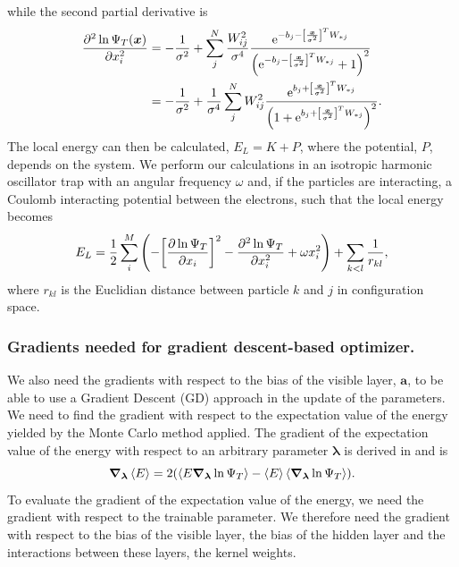 while the second partial derivative is
\begin{align*}
    \pdv[2]{\ln{\Psi_T\qty(\bm{x})}}{x_i} &= -\frac{1}{\sigma^2} + \sum_j^N \frac{W_{ij}^2}{\sigma^4} \frac{\mathrm{e}^{-b_j-\qty[\frac{\bm{x}}{\sigma^2}]^TW_{*j}}}{\qty(\mathrm{e}^{-b_j-\qty[\frac{\bm{x}}{\sigma^2}]^TW_{*j}} + 1)^2} \\
   &= -\frac{1}{\sigma^2} + \frac{1}{\sigma^4}\sum_j^N W_{ij}^2 \frac{\mathrm{e}^{b_j+\qty[\frac{\bm{x}}{\sigma^2}]^TW_{*j}}}{\qty(1 + \mathrm{e}^{b_j+\qty[\frac{\bm{x}}{\sigma^2}]^TW_{*j}})^2}. 
\end{align*}
The local energy can then be calculated, $E_L = K + P$, where the potential, $P$, depends on the system. We perform our calculations in an isotropic harmonic oscillator trap with an angular frequency $\omega$ and, if the particles are interacting, a Coulomb interacting potential between the electrons, such that the local energy becomes 
\begin{equation}
    E_L = \frac{1}{2}\sum_i^M\qty(-\qty[\pdv{\ln{\Psi_T}}{x_i}]^2-\pdv[2]{\ln{\Psi_T}}{x_i} + \omega x_i^2) + \sum_{k<l}\frac{1}{r_{kl}},  
\end{equation}
where $r_{kl}$ is the Euclidian distance between particle $k$ and $j$ in configuration space. 
\subsubsection{Gradients needed for gradient descent-based optimizer.}
We also need the gradients with respect to the bias of the visible layer, $\bm{a}$, to be able to use a Gradient Descent (GD) approach in the update of the parameters. We need to find the gradient with respect to the expectation value of the energy yielded by the Monte Carlo method applied. The gradient of the expectation value of the energy with respect to an arbitrary parameter $\bm{\lambda}$ is derived in \citep{project1} and is 
\begin{equation}\label{eq:update_rule}
    \grad_{\bm{\lambda}}\expval{E} = 2\qty(\expval{E\grad_{\bm{\lambda}}\ln{\Psi_T}} - \expval{E}\expval{\grad_{\bm{\lambda}}\ln{\Psi_T}}). 
\end{equation}
To evaluate the gradient of the expectation value of the energy, we need the gradient with respect to the trainable parameter. We therefore need the gradient with respect to the bias of the visible layer, the bias of the hidden layer and the interactions between these layers, the kernel weights. 

